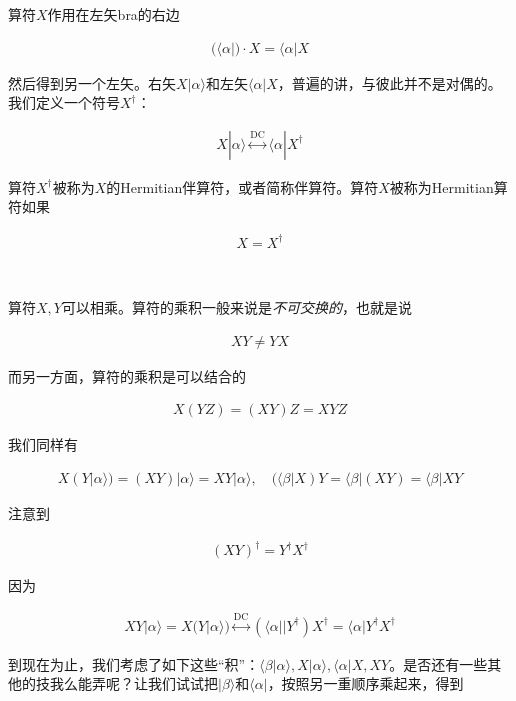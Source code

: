 \documentclass[UTF8,twoside]{ctexart}
\begin{document}
算符$X$作用在左矢bra的右边

\begin{align}
(\langle\alpha|)\cdot X=\langle\alpha|X
\end{align}

\noindent 然后得到另一个左矢。右矢$X|\alpha\rangle$和左矢$\langle\alpha|X$，普遍的讲，与彼此并不是对偶的。我们定义一个符号$X^\dagger$：

\begin{align}\label{1.2.24}
X|\alpha\rangle\overset{\text{DC}}{\longleftrightarrow}\langle\alpha|X^\dagger
\end{align}

\noindent 算符$X^\dagger$被称为$X$的Hermitian伴算符，或者简称伴算符。算符$X$被称为Hermitian算符如果

\begin{align}
X=X^\dagger
\end{align}

\ 


\noindent 算符$X, Y$可以相乘。算符的乘积一般来说是{\emph{不可交换的}}，也就是说

\begin{align}
XY\neq YX
\end{align}

\noindent 而另一方面，算符的乘积是可以结合的

\begin{align}\label{1.2.27}
X(YZ)=(XY)Z=XYZ
\end{align}

\noindent 我们同样有

\begin{align}
X(Y|\alpha\rangle) = (XY)|\alpha\rangle = XY|\alpha\rangle,\quad (\langle\beta|X)Y=\langle\beta|(XY)=\langle\beta|XY
\end{align}

\noindent 注意到

\begin{align}
(XY)^\dagger=Y^\dagger X^\dagger
\end{align}

\noindent 因为

\begin{align}
XY|\alpha\rangle = X(Y|\alpha\rangle)\overset{\text{DC}}{\longleftrightarrow}(\langle\alpha||Y^\dagger)X^\dagger = \langle\alpha|Y^\dagger X^\dagger
\end{align}

到现在为止，我们考虑了如下这些``积''：$\langle\beta|\alpha\rangle,X|\alpha\rangle,\langle\alpha|X,XY$。是否还有一些其他的技我么能弄呢？让我们试试把$|\beta\rangle$和$\langle\alpha|$，按照另一重顺序乘起来，得到
\end{document}
